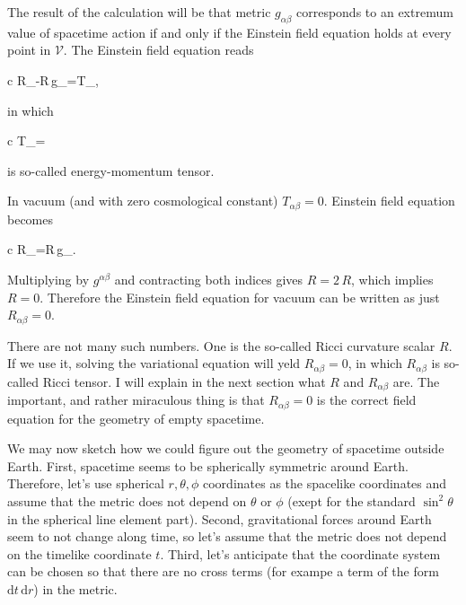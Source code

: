 \documentclass[11pt,oneside%
]{memoir}
\newenvironment{eqna}{\begin{IEEEeqnarray*}{c}}{\end{IEEEeqnarray*}\ignorespacesafterend}
\newcommand{\dd}{\mathrm{d}}
\begin{document}
The result of the calculation will be that metric \(g_{\alpha\beta}\) corresponds to an extremum value of spacetime action if and only if the Einstein field equation holds at every point in \(\mathcal{V}\). The Einstein field equation reads
\begin{eqna}
R_{\alpha\beta}-R\,g_{\alpha\beta}=T_{\alpha\beta},%
\end{eqna}
in which
\begin{eqna}
T_{\alpha\beta}=
\end{eqna}
is so-called energy-momentum tensor.

In vacuum (and with zero cosmological constant) \(T_{\alpha\beta}=0\). Einstein field equation becomes
\begin{eqna}
R_{\alpha\beta}=R\,g_{\alpha\beta}.
\end{eqna}
Multiplying by \(g^{\alpha\beta}\) and contracting both indices gives \(R=2\,R\), which implies \(R=0\). Therefore the Einstein field equation for vacuum can be written as just \(R_{\alpha\beta}=0\).




















\newpage
There are not many such numbers. One is the so-called Ricci curvature scalar \(R\). If we use it, solving the variational equation will yeld \(R_{\alpha\beta}=0\), in which \(R_{\alpha\beta}\) is so-called Ricci tensor. I will explain in the next section what \(R\) and \(R_{\alpha\beta}\) are. The important, and rather miraculous thing is that \(R_{\alpha\beta}=0\) is the correct field equation for the geometry of empty spacetime.


We may now sketch how we could figure out the geometry of spacetime outside Earth. First, spacetime seems to be spherically symmetric around Earth. Therefore, let's use spherical \(r,\theta,\phi\) coordinates as the spacelike coordinates and assume that the metric does not depend on \(\theta\) or \(\phi\) (exept for the standard \(\sin^2\theta\) in the spherical line element part). Second, gravitational forces around Earth seem to not change along time, so let's assume that the metric does not depend on the timelike coordinate \(t\). Third, let's anticipate that the coordinate system can be chosen so that there are no cross terms (for exampe a term of the form \(\dd t\,\dd r\)) in the metric.
\end{document}
